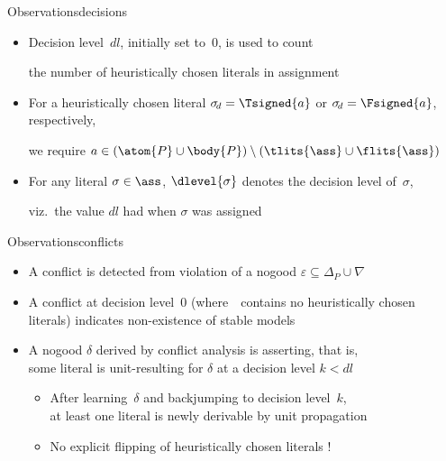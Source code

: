 \begin{frame}{Observations}{decisions}
  \bigskip
  \begin{itemize}
  \item Decision level~$\mathit{dl}$, initially set to~$0$, is used to count
    \par
    the number of heuristically chosen literals in assignment~\ass
    \smallskip
  \item For a heuristically chosen literal
    $\sigma_{\!d}=\Tsigned{a}$ or $\sigma_{\!d}=\Fsigned{a}$,
    respectively,
    \par
    we require $a\in(\atom{P}\cup\body{P})\setminus(\tlits{\ass}\cup\flits{\ass})$
    \smallskip
  \item For any literal $\sigma\in\ass$,
    $\dlevel{\sigma}$ denotes the decision level of~$\sigma$,
    \par
    viz.\ the value $\mathit{dl}$ had when $\sigma$ was assigned
  \end{itemize}
\end{frame}
\begin{frame}{Observations}{conflicts}
  \bigskip
  \begin{itemize}
  \item A conflict is detected from violation of a nogood $\varepsilon\subseteq\Delta_P\cup\nabla$
    \smallskip
  \item A conflict at decision level~$0$
    (where~\ass\ contains no heuristically chosen literals)
    indicates non-existence of stable models
    \smallskip
  \item A nogood $\delta$ derived by conflict analysis is
    \alert{asserting}, that is,\\
    some literal is unit-resulting for $\delta$ at a decision level $k<\mathit{dl}$
    \begin{itemize}\normalsize
    \item After learning~$\delta$ and backjumping to
      decision level~$k$,\\ at least one literal is
      newly derivable by unit propagation
    \smallskip
    \item No explicit flipping of heuristically chosen literals !
    \end{itemize}
  \end{itemize}
\end{frame}
